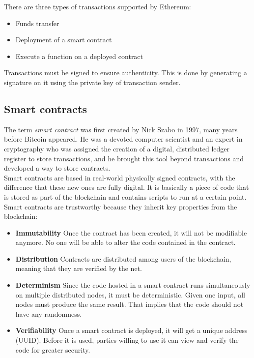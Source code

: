 \documentclass[10pt]{article}
\begin{document}
\begin{multicols}{2}
There are three types of transactions supported by Ethereum:

\begin{itemize}
	\item Funds transfer
	\item Deployment of a smart contract
	\item Execute a function on a deployed contract
\end{itemize}

Transactions must be signed to ensure authenticity. This is done by generating a signature on it using the private key of transaction sender. 

\subsection{Smart contracts}

The term \textit{smart contract} was first created by Nick Szabo in 1997, many years before Bitcoin appeared. He was a devoted computer scientist and an expert in cryptography who was assigned the creation of a digital, distributed ledger register to store transactions, and he brought this tool beyond transactions and developed a way to store contracts.\\

Smart contracts are based in real-world physically signed contracts, with the difference that these new ones are fully digital. It is basically a piece of code that is stored as part of the blockchain and contains scripts to run at a certain point.\\

Smart contracts are trustworthy because they inherit key properties from the blockchain:

\begin{itemize}
	\item \textbf{Immutability} Once the contract has been created, it will not be modifiable anymore. No one will be able to alter the code contained in the contract.
	\item \textbf{Distribution} Contracts are distributed among users of the blockchain, meaning that they are verified by the net.
	\item \textbf{Determinism} Since the code hosted in a smart contract runs simultaneously on multiple distributed nodes, it must be deterministic. Given one input, all nodes must produce the same result. That implies that the code should not have any randomness.
	\item \textbf{Verifiability} Once a smart contract is deployed, it will get a unique address (UUID). Before it is used, parties willing to use it can view and verify the code for greater security.
\end{itemize}


\end{multicols}
\end{document}
